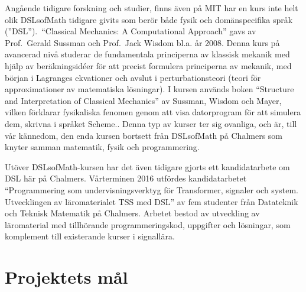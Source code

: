 \begin{draft}
Angående tidigare forskning och studier, finns även på MIT har en kurs inte helt olik DSLsofMath tidigare givits som berör både
fysik och domänspecifika språk (''DSL'').\ ``Classical Mechanics: A Computational Approach'' gavs av
Prof.\ Gerald Sussman och Prof.\ Jack Wisdom bl.a. år
2008.\cite{classical-mechanics-course-mit-2008}
Denna kurs på avancerad nivå studerar de fundamentala principerna av klassisk
mekanik med hjälp av beräkningsidéer för att precist formulera principerna av
mekanik, med början i Lagranges ekvationer och avslut i
perturbationsteori (teori för approximationer av matematiska lösningar). I kursen används boken ``Structure and %
Interpretation of Classical Mechanics'' av Sussman, Wisdom och Mayer,
vilken förklarar fysikaliska fenomen genom att visa datorprogram för att
simulera dem, skrivna i språket Scheme.\cite{SICM}.
Denna typ av kurser ter sig ovanliga, och är, till vår kännedom, den enda kursen bortsett från DSLsofMath på Chalmers som knyter samman matematik, fysik och programmering.

Utöver DSLsofMath-kursen har det även tidigare gjorts ett kandidatarbete om DSL
här på Chalmers. Vårterminen 2016 utfördes kandidatarbetet
``Programmering som undervisningsverktyg för Transformer, signaler och
system. Utvecklingen av läromaterialet TSS med DSL'' av fem studenter
från Datateknik och Teknisk Matematik på Chalmers. Arbetet bestod av
utveckling av läromaterial med tillhörande programmeringskod,
uppgifter och lösningar, som komplement till existerande kurser i
signallära.\cite{kandidat2016}
\end{draft}

%

\section{Projektets mål}

